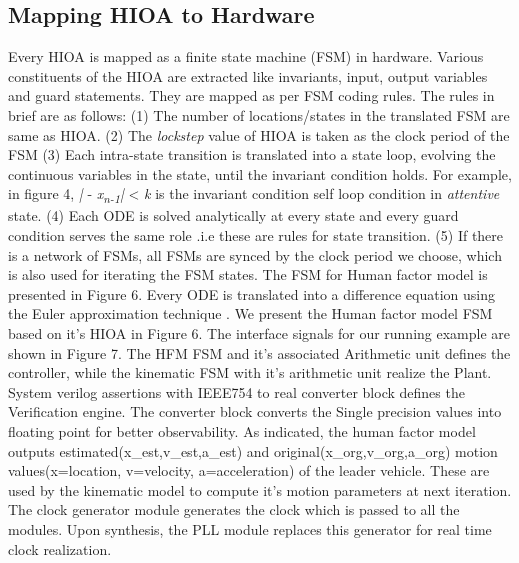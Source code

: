 {\subsection{Mapping HIOA to Hardware}
Every HIOA is mapped as a finite state machine (FSM) in hardware.
Various constituents of the HIOA are extracted like invariants, input, output variables and guard statements. They are mapped as per FSM coding rules. The rules in brief are as follows:
(1) The number of locations/states in the translated FSM are same as HIOA. (2) The \textit{lockstep} value of HIOA is taken as the clock period of the FSM
(3) Each intra-state transition is translated into a state loop, evolving the continuous variables in the state, until the invariant condition holds. For example, in figure 4, \textit{|}   - \textit{x\textsubscript{n-1}}\textit{|} < \textit{k} is the invariant condition self loop condition in \textit{attentive} state. (4) Each ODE is solved analytically at every state and every guard condition serves the same role .i.e these are rules for state transition. (5) If there is a network of FSMs, all FSMs are synced by the clock period we choose, which is also used for iterating the FSM states. The FSM for Human factor model is presented in Figure 6. 
Every ODE is translated into a difference equation using the Euler approximation technique \citep{bulirsch1966numerical}. We present the Human factor model FSM based on it's HIOA  in Figure 6.
The interface signals for our running example are shown in Figure 7. The HFM FSM and it's associated Arithmetic unit defines the controller, while the kinematic FSM with it's arithmetic unit realize the Plant. System verilog assertions with IEEE754 to real converter block defines the Verification engine. The converter block converts the Single precision values into floating point  for better observability. As indicated, the human factor model outputs estimated(x\_est,v\_est,a\_est) and original(x\_org,v\_org,a\_org) motion values(x=location, v=velocity, a=acceleration) of the leader vehicle. These are used by the kinematic model to compute it's motion parameters at next iteration. The clock generator module generates the clock which is passed to all the modules. Upon synthesis, the PLL module replaces this generator for real time clock realization.
}
